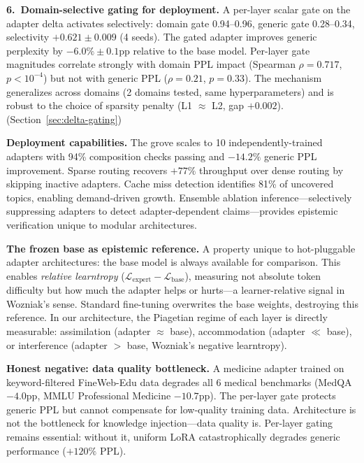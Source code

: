 \documentclass{article}
\begin{document}
\textbf{6.~Domain-selective gating for deployment.} A per-layer scalar gate
on the adapter delta activates selectively: domain gate 0.94--0.96, generic
gate 0.28--0.34, selectivity $+0.621 \pm 0.009$ (4 seeds). The gated adapter
improves generic perplexity by $-6.0\% \pm 0.1\text{pp}$ relative to the base
model. Per-layer gate magnitudes correlate strongly with domain PPL impact
(Spearman $\rho = 0.717$, $p < 10^{-4}$) but not with generic PPL
($\rho = 0.21$, $p = 0.33$). The mechanism generalizes across domains (2
domains tested, same hyperparameters) and is robust to the choice of sparsity
penalty (L1 $\approx$ L2, gap $+0.002$).
(Section~\ref{sec:delta-gating})

\textbf{Deployment capabilities.} The grove scales to 10 independently-trained
adapters with 94\% composition checks passing and $-14.2\%$ generic PPL
improvement. Sparse routing recovers $+77\%$ throughput over dense routing by
skipping inactive adapters. Cache miss detection identifies 81\% of
uncovered topics, enabling demand-driven growth. Ensemble ablation
inference---selectively suppressing adapters to detect adapter-dependent
claims---provides epistemic verification unique to modular architectures.

\textbf{The frozen base as epistemic reference.} A property unique to
hot-pluggable adapter architectures: the base model is always available
for comparison. This enables \emph{relative learntropy}
($\mathcal{L}_{\text{expert}} - \mathcal{L}_{\text{base}}$), measuring
not absolute token difficulty but how much the adapter helps or hurts---a
learner-relative signal in Wozniak's sense. Standard fine-tuning
overwrites the base weights, destroying this reference. In our
architecture, the Piagetian regime of each layer is directly measurable:
assimilation (adapter $\approx$ base), accommodation (adapter $\ll$ base),
or interference (adapter $>$ base, Wozniak's negative learntropy).

\textbf{Honest negative: data quality bottleneck.} A medicine adapter trained
on keyword-filtered FineWeb-Edu data degrades all 6 medical benchmarks
(MedQA $-4.0$pp, MMLU Professional Medicine $-10.7$pp). The per-layer gate
protects generic PPL but cannot compensate for low-quality training data.
Architecture is not the bottleneck for knowledge injection---data quality is.
Per-layer gating remains essential: without it, uniform LoRA catastrophically
degrades generic performance ($+120\%$ PPL).
\end{document}

